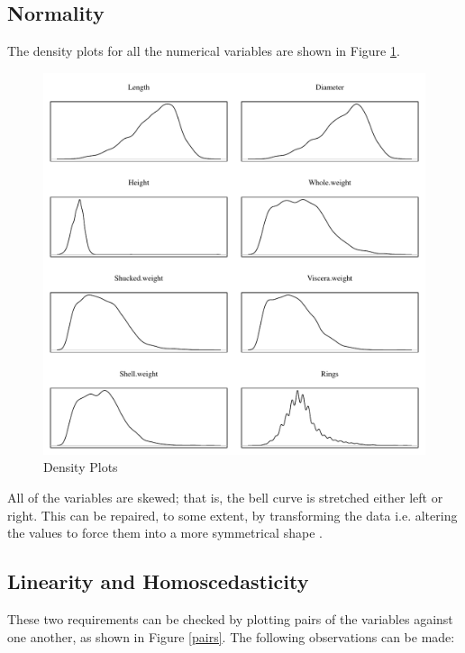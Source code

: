 \documentclass[11pt, a4paper]{article}
\begin{document}
    \subsection{Normality}

    The density plots for all the numerical variables are shown in Figure \ref{density}.

    \begin{figure}[hbt!]
        \centering
        \includegraphics[width=\textwidth]{1.4.pdf}
        \caption{Density Plots}
        \label{density}
    \end{figure}

    All of the variables are skewed; that is, the bell curve is stretched either left or right. This can be repaired, to some extent, by transforming the data i.e. altering the values to force them into a more symmetrical shape \parencite{transformations}.

    \subsection{Linearity and Homoscedasticity}

    These two requirements can be checked by plotting pairs of the variables against one another, as shown in Figure \ref{pairs}. The following observations can be made:
\end{document}
